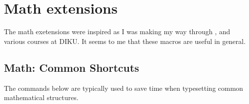 \section{Math extensions}

\def\commandstyle{{\ttfamily\textbackslash}}
\def\command#1{\texttt{\textbackslash #1}}

The math exetensions were inspired as I was making my way through
\cite{concrete-mathematics}, and various courses at DIKU. It seems to me that
these macros are useful in general.

\subsection{Math: Common Shortcuts}

The commands below are typically used to save time when typesetting common mathematical structures.

\vspace{0.1in}

